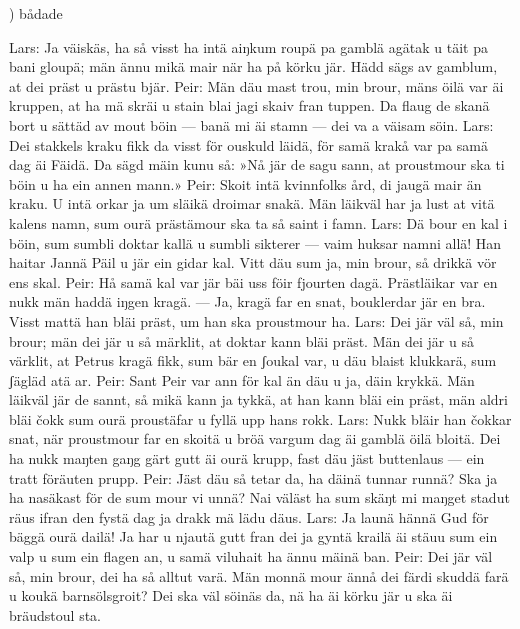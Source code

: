 \tabto{0.2cm}) \tabto{0.7cm}bådade
\newpage
\begin{multicols}{2}
Lars: Ja väiskäs, ha så visst
      ha intä aiŋkum roupä
      pa gamblä agätak
      u täit pa bani gloupä;
      män ännu mikä mair
      när ha på körku jär.
      Hädd sägs av gamblum, at
      dei präst u prästu bjär.
Peir: Män däu mast trou, min brour,
      mäns öilä var äi kruppen,
      at ha mä skräi u stain
      blai jagi skaiv fran tuppen.
      Da flaug de skanä bort
      u sättäd av mout böin —
      banä mi äi stamn —
      dei va a väisam söin.
Lars: Dei stakkels kraku fikk
      da visst för ouskuld läidä,
      för samä krakå var
      pa samä dag äi Fäidä.
      Da sägd mäin kunu så:
      »Nå jär de sagu sann,
      at proustmour ska ti böin
      u ha ein annen mann.»
Peir: Skoit intä kvinnfolks ård,
      di jaugä mair än kraku.
      U intä orkar ja
      um släikä droimar snakä.
      Män läikväl har ja lust
      at vitä kalens namn,
      sum ourä prästämour
      ska ta så saint i famn.
Lars: Dä bour en kal i böin,
      sum sumbli doktar kallä
      u sumbli sikterer —
      vaim huksar namni allä!
      Han haitar Jannä Päil
      u jär ein gidar kal.
      Vitt däu sum ja, min brour,
      så drikkä vör ens skal.
Peir: Hå samä kal var jär
      bäi uss föir fjourten dagä.
      Prästläikar var en nukk
      män haddä iŋgen kragä. —
      Ja, kragä far en snat,
      bouklerdar jär en bra.
      Visst mattä han bläi präst,
      um han ska proustmour ha.
\vfill\columnbreak
Lars: Dei jär väl så, min brour;
      män dei jär u så märklit,
      at doktar kann bläi präst.
      Män dei jär u så värklit,
      at Petrus kragä fikk,
      sum bär en ʃoukal var,
      u däu blaist klukkarä,
      sum ʃägläd atä ar.
Peir: Sant Peir var ann för kal
      än däu u ja, däin krykkä.
      Män läikväl jär de sannt,
      så mikä kann ja tykkä,
      at han kann bläi ein präst,
      män aldri bläi čokk
      sum ourä proustäfar
      u fyllä upp hans rokk.
Lars: Nukk bläir han čokkar snat,
      när proustmour far en skoitä
      u bröä vargum dag
      äi gamblä öilä bloitä.
      Dei ha nukk maŋten gaŋg
      gärt gutt äi ourä krupp,
      fast däu jäst buttenlaus —
      ein tratt föräuten prupp.
Peir: Jäst däu så tetar da,
      ha däinä tunnar runnä?
      Ska ja ha nasäkast
      för de sum mour vi unnä?
      Nai väläst ha sum skäŋt
      mi maŋget stadut räus
      ifran den fystä dag
      ja drakk mä lädu däus.
Lars: Ja launä hännä Gud
      för bäggä ourä dailä!
      Ja har u njautä gutt
      fran dei ja gyntä krailä
      äi stäuu sum ein valp
      u sum ein flagen an,
      u samä viluhait
      ha ännu mäinä ban.
Peir: Dei jär väl så, min brour,
      dei ha så alltut varä.
      Män monnä mour ännå
      dei färdi skuddä farä
      u koukä barnsölsgroit?
      Dei ska väl söinäs da,
      nä ha äi körku jär
      u ska äi bräudstoul sta.
\end{multicols}

